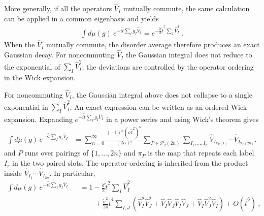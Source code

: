\documentclass{article}
\theoremstyle{definition}
\newcommand{\nn}{\nonumber}
\newcommand{\lb}{\left(}
\newcommand{\rb}{\right)}
\begin{document}
    More generally, if all the operators $\hat{V}_{I}$ mutually commute, the
    same calculation can be applied in a common eigenbasis and yields
    \begin{eqnarray}
        \int d\mu(g)\:e^{-i\tilde{t}\sum_I g_I\hat{V}_I}=e^{-\frac{\tilde{\sigma}}{2}\tilde{t}^2\sum_I \hat{V}_I^2}\ .
    \end{eqnarray}
When the $\widehat V_I$ mutually commute, the disorder average therefore
produces an exact Gaussian decay.  For noncommuting $\widehat V_I$ the
Gaussian integral does not reduce to the exponential of
$\sum_I\widehat V_I^2$; the deviations are controlled by the operator
ordering in the Wick expansion.

    For noncommuting $\hat{V}_{I}$, the Gaussian integral above does not
    collapse to a single exponential in $\sum_{I}\hat{V}_{I}^{2}$. An exact expression
    can be written as an ordered Wick expansion. Expanding
    $e^{-i\tilde{t}\sum_I g_I\hat{V}_I}$ in a power series and using Wick's
    theorem gives
        \begin{align}
    \int d\mu(g)\,
    e^{-i\tilde{t}\sum_Ig_I\widehat V_I}
    &=
    \sum_{n=0}^{\infty}
    \frac{(-1)^n(\sigma \tilde{t}^2)^n}{(2n)!}
    \sum_{P\in\mathcal P_2(2n)}
    \sum_{I_1,\ldots,I_n}
    \widehat V_{I_{\pi_P(1)}}\cdots
    \widehat V_{I_{\pi_P(2n)}} .
\end{align}
    and $P$ runs over pairings of $\{1,\ldots,2n\}$ and $\pi_{P}$ is the map
    that repeats each label $I_{r}$ in the two paired slots. The operator ordering
    is inherited from the product inside $\hat{V}_{I_1}\cdots\hat{V}_{I_{2n}}$.
    In particular,
    \begin{eqnarray}
        \int d\mu(g)\:e^{-i\tilde{t}\sum_I g_I\hat{V}_I} &&=1-\frac{\tilde{\sigma}}{2}\tilde{t}^2\sum_I
        \hat{V}_I^2\nn\\
        &&\qquad+\frac{\tilde{\sigma}^{2}}{24}\tilde{t}^4\sum_{I,J}\lb \hat{V}_I^2\hat{V}_J^2+\hat{V}_I\hat{V}_J\hat{V}_I\hat{V}_J+\hat{V}_I\hat{V}_J^2\hat{V}_I\rb+O(\tilde{t}^6)\ ,
    \end{eqnarray}
\end{document}
